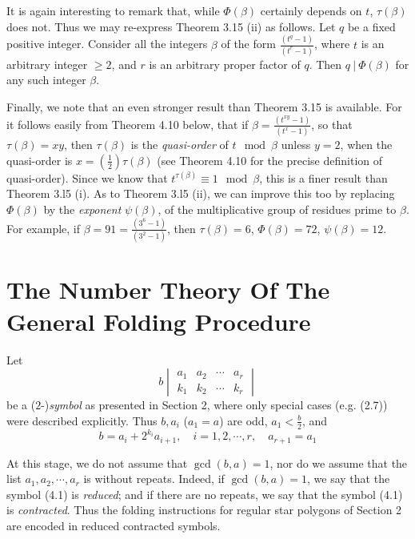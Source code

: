 It is again interesting to remark that, while $\Phi(\beta)$ certainly depends on $t$, $\tau(\beta)$ does not. Thus we may re-express Theorem 3.15 (ii) as follows. Let $q$ be a fixed positive integer. Consider all the integers $\beta$ of the form $\frac{(t^{q}-1)}{(t^{r}-1)}$, where $t$ is an arbitrary integer $\geq 2$, and $r$ is an arbitrary proper factor of $q$. Then $q\ |\ \Phi(\beta)$ for any such integer $\beta$.

Finally, we note that an even stronger result than Theorem 3.15 is available. For it follows easily from Theorem 4.10 below, that if $\beta = \frac{(t^{xy}-1)}{(t^{x}-1)}$, so that $\tau(\beta) = xy$, then $\tau(\beta)$ is the \emph{quasi-order} of $t \mod{\beta}$ unless $y = 2$, when the quasi-order is $x = \left( \frac{1}{2} \right) \tau(\beta)$ (see Theorem 4.10 for the precise definition of quasi-order). Since we know that $t^{\tau(\beta)} \equiv 1 \mod{\beta}$, this is a finer result than Theorem 3.l5 (i). As to Theorem 3.l5 (ii), we can improve this too by replacing $\Phi(\beta)$ by the \emph{exponent} $\psi(\beta)$, of the multiplicative group of residues prime to $\beta$. For example, if $\beta = 91 = \frac{(3^{6}-1)}{(3^{2}-1)}$, then $\tau(\beta) = 6$, $\Phi(\beta) = 72$, $\psi(\beta) = 12$.




\newpage

\section{The Number Theory Of The General Folding Procedure}


Let
\begin{equation}
b \begin{vmatrix}
a_{1} & a_{2} & \cdots & a_{r} \\
k_{1} & k_{2} & \cdots & k_{r}
\end{vmatrix} \tag{4.1}
\end{equation}
be a ($2$-)\emph{symbol} as presented in Section 2, where only special cases (e.g. (2.7)) were described explicitly. Thus $b,a_{i}$ ($a_{1} = a$) are odd, $a_{1} < \frac{b}{2}$, and
\begin{equation}
b = a_{i} + 2^{k_i} a_{i+1}, \quad i = 1,2,\cdots,r, \quad a_{r+1} = a_{1}  \tag{4.2}
\end{equation}

At this stage, we do not assume that $\gcd(b,a) = 1$, nor do we assume that the list $a_{1}, a_{2}, \cdots, a_{r}$ is without repeats. Indeed, if $\gcd(b,a) = 1$, we say that the symbol (4.1) is \emph{reduced}; and if there are no repeats, we say that the symbol (4.1) is \emph{contracted}. Thus the folding instructions for regular star polygons of Section 2 are encoded in reduced contracted symbols.


